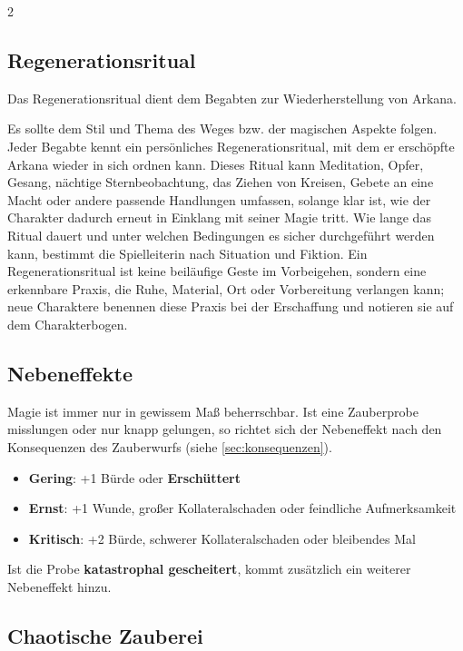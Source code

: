 \begin{multicols*}{2}
\subsection{Regenerationsritual}\label{subsec:regenerationsritual}

Das Regenerationsritual dient dem Begabten zur Wiederherstellung von Arkana.

Es sollte dem Stil und Thema des Weges bzw. der magischen Aspekte folgen.
Jeder Begabte kennt ein persönliches Regenerationsritual, mit dem er erschöpfte Arkana wieder in sich ordnen kann. Dieses Ritual kann Meditation, Opfer, Gesang, nächtige Sternbeobachtung, das Ziehen von Kreisen, Gebete an eine Macht oder andere passende Handlungen umfassen, solange klar ist, wie der Charakter dadurch erneut in Einklang mit seiner Magie tritt.
Wie lange das Ritual dauert und unter welchen Bedingungen es sicher durchgeführt werden kann, bestimmt die Spielleiterin nach Situation und Fiktion. Ein Regenerationsritual ist keine beiläufige Geste im Vorbeigehen, sondern eine erkennbare Praxis, die Ruhe, Material, Ort oder Vorbereitung verlangen kann; neue Charaktere benennen diese Praxis bei der Erschaffung und notieren sie auf dem Charakterbogen.

\subsection{Nebeneffekte}\label{subsec:nebeneffekte}

Magie ist immer nur in gewissem Maß beherrschbar.
Ist eine Zauberprobe misslungen oder nur knapp gelungen, so richtet sich der Nebeneffekt nach den Konsequenzen des Zauberwurfs (siehe \cref{sec:konsequenzen}).

\begin{itemize}[leftmargin=*]
\item \textbf{Gering}: +1 Bürde oder \textbf{Erschüttert}
\item \textbf{Ernst}: +1 Wunde, großer Kollateralschaden oder feindliche Aufmerksamkeit
\item \textbf{Kritisch}: +2 Bürde, schwerer Kollateralschaden oder bleibendes Mal
\end{itemize}

Ist die Probe \textbf{katastrophal gescheitert}, kommt zusätzlich ein weiterer Nebeneffekt hinzu.

\subsection{Chaotische Zauberei}\label{subsec:chaotische-zauberei}


\end{multicols*}
